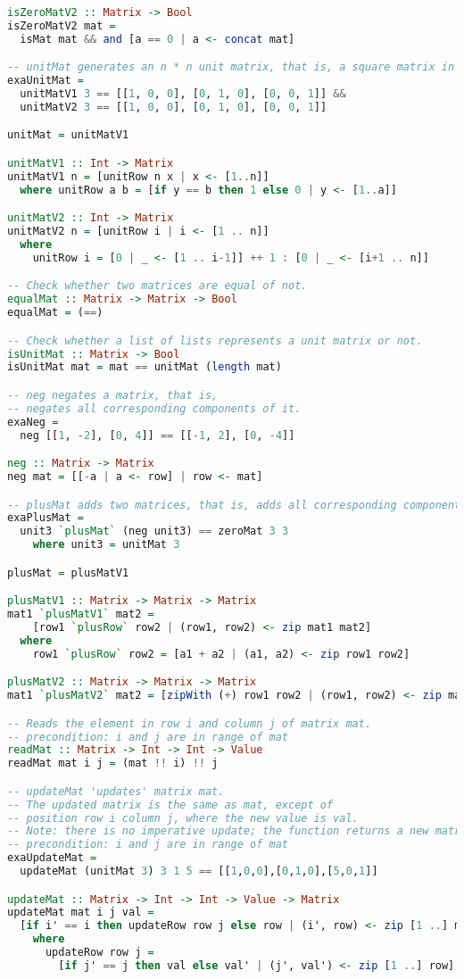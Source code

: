 \begin{lstlisting}[language=Haskell]
isZeroMatV2 :: Matrix -> Bool
isZeroMatV2 mat =
  isMat mat && and [a == 0 | a <- concat mat]

-- unitMat generates an n * n unit matrix, that is, a square matrix in which all entries are zero, except of the elements on the main diagonal, which are 1.
exaUnitMat =
  unitMatV1 3 == [[1, 0, 0], [0, 1, 0], [0, 0, 1]] &&
  unitMatV2 3 == [[1, 0, 0], [0, 1, 0], [0, 0, 1]]

unitMat = unitMatV1

unitMatV1 :: Int -> Matrix
unitMatV1 n = [unitRow n x | x <- [1..n]]
  where unitRow a b = [if y == b then 1 else 0 | y <- [1..a]]

unitMatV2 :: Int -> Matrix
unitMatV2 n = [unitRow i | i <- [1 .. n]]
  where
    unitRow i = [0 | _ <- [1 .. i-1]] ++ 1 : [0 | _ <- [i+1 .. n]]

-- Check whether two matrices are equal of not.
equalMat :: Matrix -> Matrix -> Bool
equalMat = (==)

-- Check whether a list of lists represents a unit matrix or not.
isUnitMat :: Matrix -> Bool
isUnitMat mat = mat == unitMat (length mat)

-- neg negates a matrix, that is,
-- negates all corresponding components of it.
exaNeg =
  neg [[1, -2], [0, 4]] == [[-1, 2], [0, -4]]

neg :: Matrix -> Matrix
neg mat = [[-a | a <- row] | row <- mat]

-- plusMat adds two matrices, that is, adds all corresponding components of them. precondition: mat1 and mat2 have the same size
exaPlusMat =
  unit3 `plusMat` (neg unit3) == zeroMat 3 3
    where unit3 = unitMat 3

plusMat = plusMatV1

plusMatV1 :: Matrix -> Matrix -> Matrix
mat1 `plusMatV1` mat2 = 
    [row1 `plusRow` row2 | (row1, row2) <- zip mat1 mat2]
  where
    row1 `plusRow` row2 = [a1 + a2 | (a1, a2) <- zip row1 row2]

plusMatV2 :: Matrix -> Matrix -> Matrix
mat1 `plusMatV2` mat2 = [zipWith (+) row1 row2 | (row1, row2) <- zip mat1 mat2]

-- Reads the element in row i and column j of matrix mat.
-- precondition: i and j are in range of mat
readMat :: Matrix -> Int -> Int -> Value
readMat mat i j = (mat !! i) !! j

-- updateMat 'updates' matrix mat.
-- The updated matrix is the same as mat, except of
-- position row i column j, where the new value is val.
-- Note: there is no imperative update; the function returns a new matrix.
-- precondition: i and j are in range of mat
exaUpdateMat =
  updateMat (unitMat 3) 3 1 5 == [[1,0,0],[0,1,0],[5,0,1]]

updateMat :: Matrix -> Int -> Int -> Value -> Matrix
updateMat mat i j val =
  [if i' == i then updateRow row j else row | (i', row) <- zip [1 ..] mat]
    where
      updateRow row j =
        [if j' == j then val else val' | (j', val') <- zip [1 ..] row]

\end{lstlisting}

\clearpage